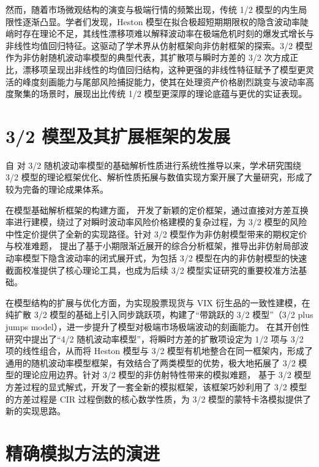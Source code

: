 然而，随着市场微观结构的演变与极端行情的频繁出现，传统 1/2 模型的内生局限性逐渐凸显。学者们发现，Heston 模型在拟合极超短期期限权的隐含波动率陡峭时存在理论不足，其线性漂移项难以解释波动率在极端危机时刻的爆发式增长与非线性均值回归特征\citep{jonesDynamicsStochasticVolatility2003}。这驱动了学术界从仿射框架向非仿射框架的探索。3/2 模型作为非仿射随机波动率模型的典型代表，其扩散项与瞬时方差的 3/2 次方成正比，漂移项呈现出非线性的均值回归结构，这种更强的非线性特征赋予了模型更灵活的峰度刻画能力与尾部风险捕捉能力，使其在处理资产价格剧烈跳变与波动率高度聚集的场景时，展现出比传统 1/2 模型更深厚的理论底蕴与更优的实证表现。

\section{3/2 模型及其扩展框架的发展}

自 \citet{lewisOptionValuationStochastic2000} 对 3/2 随机波动率模型的基础解析性质进行系统性推导以来，学术研究围绕 3/2 模型的理论框架优化、解析性质拓展与数值实现方案开展了大量研究，形成了较为完备的理论成果体系。

在模型基础解析框架的构建方面，\citet{carrNewApproachOption2007} 开发了新颖的定价框架，通过直接对方差互换率进行建模，绕过了对瞬时波动率风险价格建模的复杂过程，为 3/2 模型的风险中性定价提供了全新的实现路径。针对 3/2 模型作为非仿射模型带来的期权定价与校准难题，\citet{medvedevApproximationCalibrationShortTerm2007} 提出了基于小期限渐近展开的综合分析框架，推导出非仿射局部波动率模型下隐含波动率的闭式展开式，为包括 3/2 模型在内的非仿射模型的快速截面校准提供了核心理论工具，也成为后续 3/2 模型实证研究的重要校准方法基础。

在模型结构的扩展与优化方面，为实现股票现货与 VIX 衍生品的一致性建模，\citet{baldeauxConsistentModelingVIX2012}在纯扩散 3/2 模型的基础上引入同步跳跃项，构建了“带跳跃的 3/2 模型”（3/2 plus jumps model），进一步提升了模型对极端市场极端波动的刻画能力。\citet{grasselli42Stochastic2017} 在其开创性研究中提出了“4/2 随机波动率模型”，将瞬时方差的扩散项设定为 1/2 项与 3/2 项的线性组合，从而将 Heston 模型与 3/2 模型有机地整合在同一框架内，形成了通用的随机波动率模型框架，有效结合了两类模型的优势，极大地拓展了 3/2 模型的理论应用边界。针对 3/2 模型的非仿射特性带来的模拟难题，\citet{kouarfateExplicitSolutionSimulation2021} 基于 3/2 模型方差过程的显式解式，开发了一套全新的模拟框架，该框架巧妙利用了 3/2 模型的方差过程是 CIR 过程倒数的核心数学性质，为 3/2 模型的蒙特卡洛模拟提供了新的实现思路。

\section{精确模拟方法的演进}

